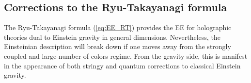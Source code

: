 \documentclass[twocolumn]{revtex4}
\providecommand{\eq}[2]{
    \begin{equation}
        #2
    \label{eq:#1}
    \end{equation}
}
\begin{document}




\subsection{Corrections to the Ryu-Takayanagi formula} \label{ss:EE_HO}

The Ryu-Takayanagi formula (\ref{eq:EE_RT}) provides the EE for holographic theories dual to Einstein gravity in general dimensions. Nevertheless, the Einsteinian description will break down if one moves away from the strongly coupled and large-number of colors regime. From the gravity side, this is manifest in the appearance of both stringy and quantum corrections to classical Einstein gravity.
\end{document}
